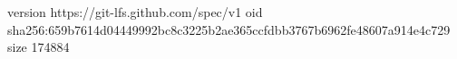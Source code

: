 version https://git-lfs.github.com/spec/v1
oid sha256:659b7614d04449992bc8c3225b2ae365ccfdbb3767b6962fe48607a914e4c729
size 174884
